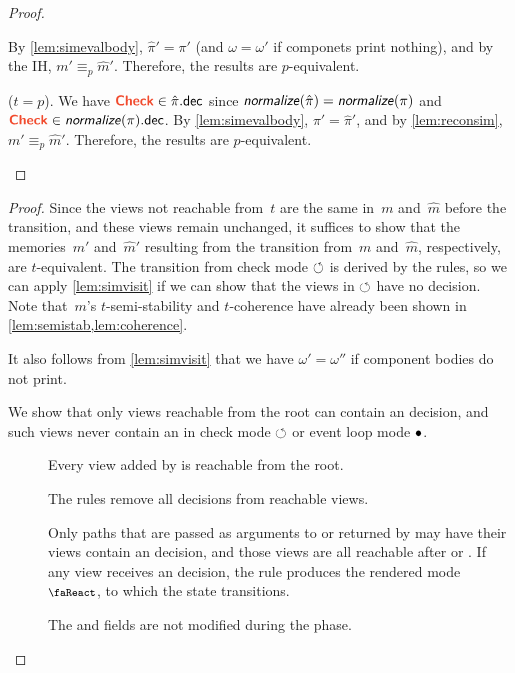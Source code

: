 \begin{proof}
\begin{description}
\begin{itemize}
          By \cref{lem:simevalbody}, $\hat \pi' = \pi'$ (and $\omega = \omega'$ if componets print nothing),
          and by the IH, $m' \equiv_p \hat m'$.
          Therefore, the results are $p$-equivalent.
      \end{itemize}
    \item[{\normalfont\Rule{CheckEffect}}] ($t = p$).
      We have $\dec{Check} \in \hat \pi.\field{dec}$ since $\textsf{\textit{normalize}}(\hat \pi) = \textsf{\textit{normalize}}(\pi)$ and $\dec{Check} \in \sem{normalize}(\pi).\field{dec}$.
      By \cref{lem:simevalbody}, $\pi' = \hat \pi'$,
      and by \cref{lem:reconsim}, $m' \equiv_p \hat m'$.
      Therefore, the results are $p$-equivalent. \qedhere
  \end{description}
\end{proof}

\simtransthm*

\begin{proof}
  Since the views not reachable from~$t$ are the same in~$m$ and~$\hat m$ before the transition,
  and these views remain unchanged, it suffices to show that the memories~$m'$ and~$\hat m'$ resulting from the transition from~$m$ and~$\hat m$, respectively, are $t$-equivalent.
  The transition from check mode $\circlearrowleft$ is derived by the  rules,
  so we can apply \cref{lem:simvisit}
  if we can show that the views in $\circlearrowleft$ have no  decision.
  Note that~$m$'s $t$-semi-stability and $t$-coherence have already been shown in \cref{lem:semistab,lem:coherence}.

  It also follows from \cref{lem:simvisit} that we have $\omega' = \omega''$ if component bodies do not print.

  We show that only views reachable from the root can contain an  decision, and such views never contain an  in check mode $\circlearrowleft$ or event loop mode $\bullet$.
  \begin{description}
    \item[{\normalfont{}}] Every view added by  is reachable from the root.
    \item[{\normalfont{}}] The  rules remove all  decisions from reachable views.
    \item[{\normalfont{}}] Only paths that are passed as arguments to  or returned by  may have their views contain an  decision,
    and those views are all reachable after  or .
    If any view receives an  decision, the  rule produces the rendered mode $\rendermode$, to which the state transitions.
    \item[{\normalfont{}}] The  and  fields are not modified during the  phase. \qedhere
  \end{description}
\end{proof}

